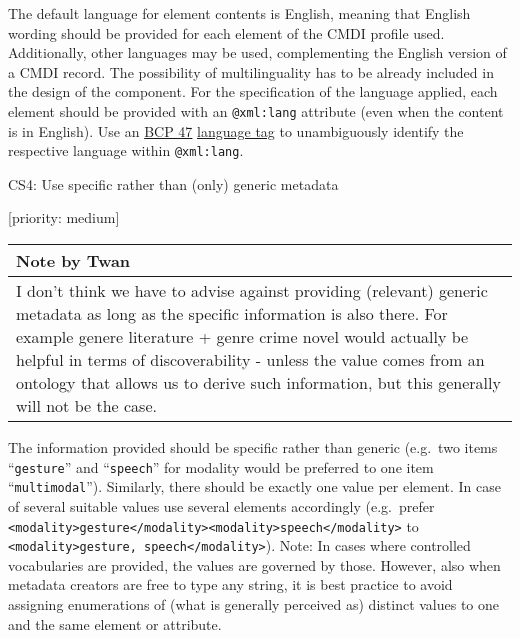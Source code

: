 \documentclass[]{article}
\begin{document}
The default language for element contents is English, meaning that
English wording should be provided for each element of the CMDI profile
used. Additionally, other languages may be used, complementing the
English version of a CMDI record. The possibility of multilinguality has
to be already included in the design of the component. For the
specification of the language applied, each element should be provided
with an \texttt{@xml:lang} attribute (even when the content is in
English). Use an \href{https://tools.ietf.org/rfc/bcp/bcp47.txt}{BCP 47}
\href{https://tools.ietf.org/rfc/bcp/bcp47.txt}{language tag} to
unambiguously identify the respective language within
\texttt{@xml:lang}.

CS4: Use specific rather than (only) generic metadata

{[}priority: medium{]}

\begin{longtable}[c]{@{}l@{}}
\toprule
\begin{minipage}[b]{0.07\columnwidth}\raggedright\strut
Note by Twan
\strut\end{minipage}\tabularnewline
\midrule
\endhead
\begin{minipage}[t]{0.07\columnwidth}\raggedright\strut
I don't think we have to advise against providing (relevant) generic
metadata as long as the specific information is also there. For example
genere literature + genre crime novel would actually be helpful in terms
of discoverability - unless the value comes from an ontology that allows
us to derive such information, but this generally will not be the case.
\strut\end{minipage}\tabularnewline
\bottomrule
\end{longtable}

The information provided should be specific rather than generic
(e.g.~two items ``\texttt{gesture}'' and ``\texttt{speech}'' for
modality would be preferred to one item ``\texttt{multimodal}'').
Similarly, there should be exactly one value per element. In case of
several suitable values use several elements accordingly (e.g.~prefer
\texttt{\textless{}modality\textgreater{}gesture\textless{}/modality\textgreater{}\textless{}modality\textgreater{}speech\textless{}/modality\textgreater{}}
to
\texttt{\textless{}modality\textgreater{}gesture,\ speech\textless{}/modality\textgreater{}}).
Note: In cases where controlled vocabularies are provided, the values
are governed by those. However, also when metadata creators are free to
type any string, it is best practice to avoid assigning enumerations of
(what is generally perceived as) distinct values to one and the same
element or attribute.
\end{document}
